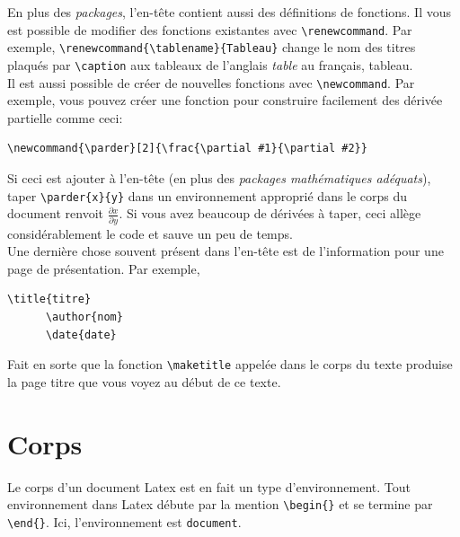 \documentclass[12pt]{article}
\renewcommand{\tablename}{Tableau}
\renewcommand \tablename{Tableau} %
\newcommand{\parder}[2]{\frac{\partial #1}{\partial #2}}
\begin{document}
   En plus des \textit{packages}, l'en-tête contient aussi des définitions de fonctions. Il vous est possible de modifier des fonctions existantes avec \lstinline|\renewcommand|. Par exemple, \lstinline|\renewcommand{\tablename}{Tableau}| change le nom des titres plaqués par \lstinline|\caption| aux tableaux de l'anglais \textit{table} au français, tableau. \\
   
   Il est aussi possible de créer de nouvelles fonctions avec \lstinline|\newcommand|. Par exemple, vous pouvez créer une fonction pour construire facilement des dérivée partielle comme ceci: \\
   
   \begin{lstlisting}[frame=single]
      \newcommand{\parder}[2]{\frac{\partial #1}{\partial #2}}
   \end{lstlisting}
   
   Si ceci est ajouter à l'en-tête (en plus des \textit{packages mathématiques adéquats}), taper \lstinline|\parder{x}{y}| dans un environnement approprié dans le corps du document renvoit $\parder{x}{y}$. Si vous avez beaucoup de dérivées à taper, ceci allège considérablement le code et sauve un peu de temps. \\
   
   Une dernière chose souvent présent dans l'en-tête est de l'information pour une page de présentation. Par exemple,
   \begin{lstlisting}[frame=single]
      \title{titre}
      \author{nom}
      \date{date}
   \end{lstlisting}
   
   Fait en sorte que la fonction \lstinline|\maketitle| appelée dans le corps du texte produise la page titre que vous voyez au début de ce texte.
   
   \section{Corps}
   
   Le corps d'un document Latex est en fait un type d'environnement. Tout environnement dans Latex débute par la mention \lstinline|\begin{}| et se termine par \lstinline|\end{}|. Ici, l'environnement est \lstinline|document|.
   
\end{document}
